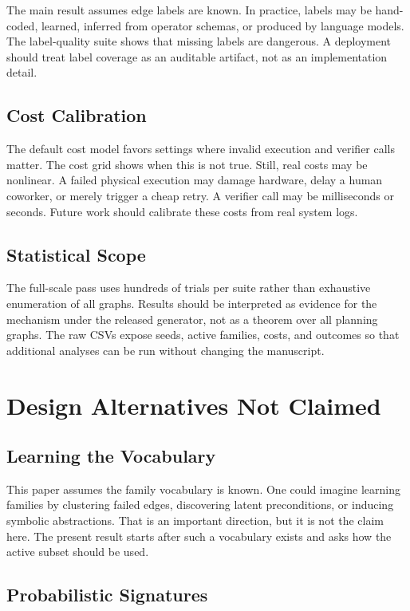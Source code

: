 \documentclass{article}
\begin{document}
The main result assumes edge labels are known. In practice, labels may be hand-coded, learned, inferred from operator schemas, or produced by language models. The label-quality suite shows that missing labels are dangerous. A deployment should treat label coverage as an auditable artifact, not as an implementation detail.

\subsection{Cost Calibration}

The default cost model favors settings where invalid execution and verifier calls matter. The cost grid shows when this is not true. Still, real costs may be nonlinear. A failed physical execution may damage hardware, delay a human coworker, or merely trigger a cheap retry. A verifier call may be milliseconds or seconds. Future work should calibrate these costs from real system logs.

\subsection{Statistical Scope}

The full-scale pass uses hundreds of trials per suite rather than exhaustive enumeration of all graphs. Results should be interpreted as evidence for the mechanism under the released generator, not as a theorem over all planning graphs. The raw CSVs expose seeds, active families, costs, and outcomes so that additional analyses can be run without changing the manuscript.

\section{Design Alternatives Not Claimed}

\subsection{Learning the Vocabulary}

This paper assumes the family vocabulary is known. One could imagine learning families by clustering failed edges, discovering latent preconditions, or inducing symbolic abstractions. That is an important direction, but it is not the claim here. The present result starts after such a vocabulary exists and asks how the active subset should be used.

\subsection{Probabilistic Signatures}
\end{document}

